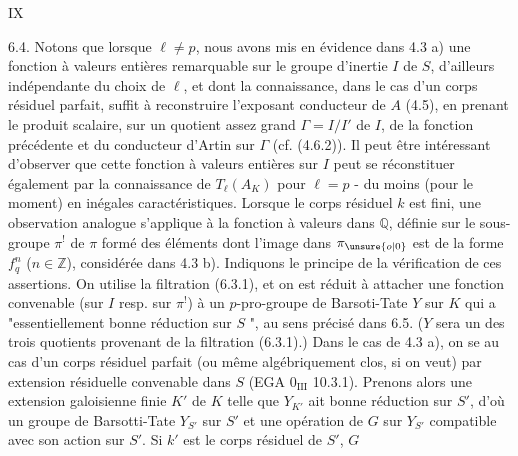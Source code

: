 \hfill IX

6.4. Notons que lorsque $\ell\ne p$, nous avons mis en évidence dans 4.3 a) une fonction à valeurs entières remarquable sur le groupe d'inertie $I$ de $S$, d'ailleurs indépendante du choix de $\ell$, et dont la connaissance, dans le cas d'un corps résiduel parfait, suffit à reconstruire l'exposant conducteur de $A$ (4.5), en prenant le produit scalaire, sur un quotient assez grand $\Gamma=I/I'$ de $I$, de la fonction précédente et du conducteur d'Artin sur $\Gamma$ (cf. (4.6.2)). Il peut être intéressant d'observer que cette fonction à valeurs entières sur $I$ peut se réconstituer également par la connaissance de $T_\ell(A_K)$ pour $\ell=p$ - du moins (pour le moment) en inégales caractéristiques. Lorsque le corps résiduel $k$ est fini, une observation analogue s'applique à la fonction à valeurs dans $\mathbb Q$, définie sur le sous-groupe $\pi^!$ de $\pi$ formé des éléments dont l'image dans $\pi_{\unsure{o|0}}$ est de la forme $f_q^n$ ($n\in\mathbb Z$), considérée dans 4.3 b). Indiquons le principe de la vérification de ces assertions. On utilise la filtration (6.3.1), et on est réduit à attacher une fonction convenable (sur $I$ resp. sur $\pi^!$) à un $p$-pro-groupe de Barsoti-Tate $Y$ sur $K$ qui a "essentiellement bonne réduction sur $S$ ", au sens précisé dans 6.5. ($Y$ sera un des trois quotients provenant de la filtration (6.3.1).) Dans le cas de 4.3 a), on se  au cas d'un corps résiduel parfait (ou même algébriquement clos, si on veut) par extension résiduelle convenable dans $S$ (EGA $0_{\mathrm{III}}$ 10.3.1). Prenons alors une extension galoisienne finie $K'$ de $K$ telle que $Y_{K'}$ ait bonne réduction sur $S'$, d'où un groupe de Barsotti-Tate $Y_{S'}$ sur $S'$ et une opération de $G$ sur $Y_{S'}$ compatible avec son action sur $S'$. Si $k'$ est le corps résiduel de $S'$, $G$

